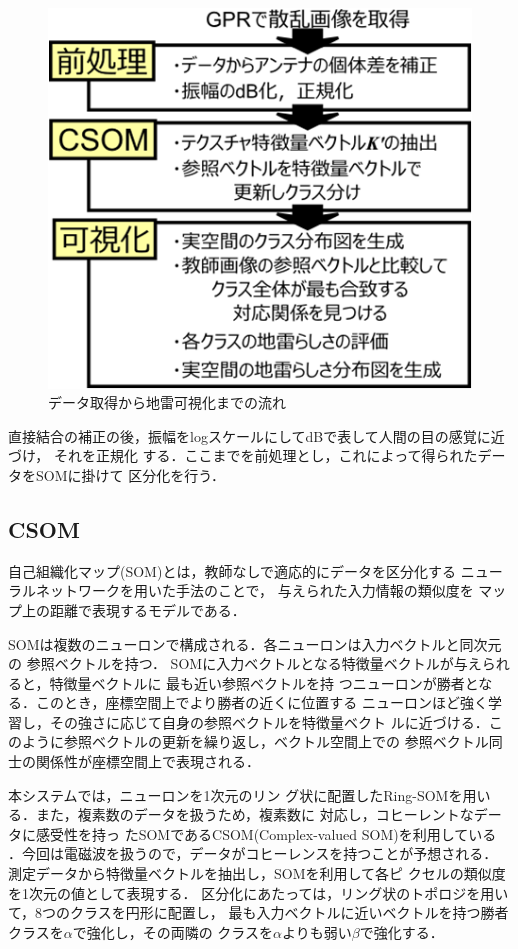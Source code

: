 ﻿\documentclass[12pt,oneside]{jsbook}
\begin{document}
\begin{figure}[btp]
\begin{center}
\includegraphics[width =0.8\hsize ]{flowchart.png}
\caption{データ取得から地雷可視化までの流れ}
\label{flow}
\end{center}        
\end{figure}

直接結合の補正の後，振幅をlogスケールにしてdBで表して人間の目の感覚に近づけ，
それを正規化
する．ここまでを前処理とし，これによって得られたデータをSOMに掛けて
区分化を行う．
\subsection{CSOM}
自己組織化マップ(SOM)とは，教師なしで適応的にデータを区分化する
ニューラルネットワークを用いた手法のことで，
与えられた入力情報の類似度を
マップ上の距離で表現するモデルである．

SOMは複数のニューロンで構成される．各ニューロンは入力ベクトルと同次元の
参照ベクトルを持つ．
SOMに入力ベクトルとなる特徴量ベクトルが与えられると，特徴量ベクトルに
最も近い参照ベクトルを持
つニューロンが勝者となる．このとき，座標空間上でより勝者の近くに位置する
ニューロンほど強く学習し，その強さに応じて自身の参照ベクトルを特徴量ベクト
ルに近づける．このように参照ベクトルの更新を繰り返し，ベクトル空間上での
参照ベクトル同士の関係性が座標空間上で表現される．

本システムでは，ニューロンを1次元のリン
グ状に配置したRing-SOMを用いる．また，複素数のデータを扱うため，複素数に
対応し，コヒーレントなデータに感受性を持っ
たSOMであるCSOM(Complex-valued SOM)を利用している
．今回は電磁波を扱うので，データがコヒーレンスを持つことが予想される．
測定データから特徴量ベクトルを抽出し，SOMを利用して各ピ
クセルの類似度を1次元の値として表現する．
区分化にあたっては，リング状のトポロジを用いて，8つのクラスを円形に配置し，
最も入力ベクトルに近いベクトルを持つ勝者クラスを$\alpha$で強化し，その両隣の
クラスを$\alpha$よりも弱い$\beta$で強化する．
\end{document}
